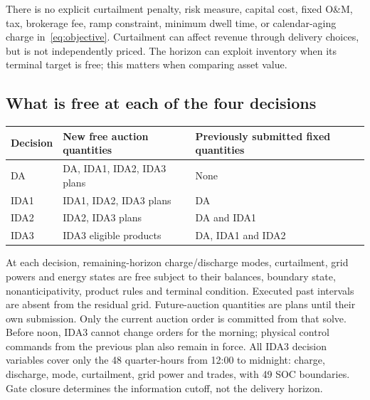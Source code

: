 \documentclass[11pt,a4paper]{article}
\begin{document}
There is no explicit curtailment penalty, risk measure, capital cost, fixed O\&M,
tax, brokerage fee, ramp constraint, minimum dwell time, or calendar-aging charge
in~\eqref{eq:objective}. Curtailment can affect revenue through delivery choices,
but is not independently priced. The horizon can exploit inventory when its
terminal target is free; this matters when comparing asset value.

\subsection{What is free at each of the four decisions}
\begin{center}\small
\begin{tabular}{p{}p{}p{}}
\toprule Decision & New free auction quantities & Previously submitted fixed quantities\\
\midrule
DA & DA, IDA1, IDA2, IDA3 plans & None\\
IDA1 & IDA1, IDA2, IDA3 plans & DA\\
IDA2 & IDA2, IDA3 plans & DA and IDA1\\
IDA3 & IDA3 eligible products & DA, IDA1 and IDA2\\
\bottomrule
\end{tabular}
\end{center}
At each decision, remaining-horizon charge/discharge modes, curtailment, grid
powers and energy states are free subject to their balances, boundary state,
nonanticipativity, product rules and terminal condition. Executed past intervals
are absent from the residual grid. Future-auction quantities are plans until
their own submission. Only the current auction order is committed from that
solve. Before noon, IDA3 cannot change orders for the morning; physical control
commands from the previous plan also remain in force. All IDA3 decision
variables cover only the 48 quarter-hours from 12:00 to midnight: charge,
discharge, mode, curtailment, grid power and trades, with 49 SOC boundaries.
Gate closure determines the information cutoff, not the delivery horizon.
\end{document}
